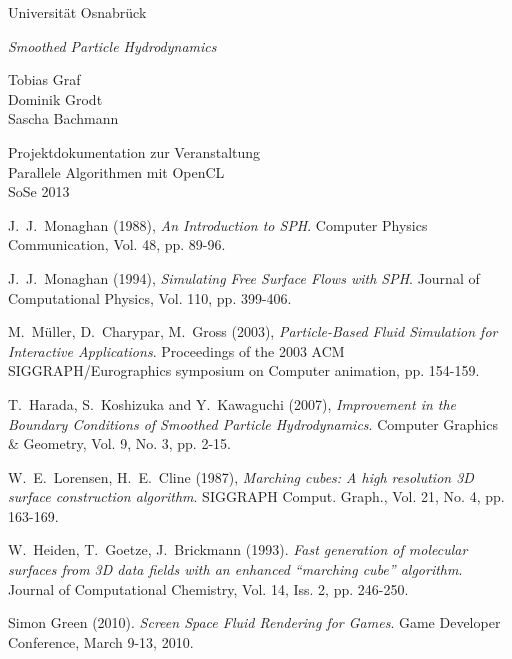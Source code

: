 \documentclass[a4paper,12pt,oneside]{amsbook}
\begin{document}
\begin{titlepage}
\begin{center}
{\large Universität Osnabrück}


\vspace{9em}
{\LARGE \emph{Smoothed Particle Hydrodynamics}}

\vspace{2em}
{\large Tobias Graf\\ Dominik Grodt\\ Sascha Bachmann}

\vspace{9em}
{\large Projektdokumentation zur Veranstaltung\\ Parallele Algorithmen mit OpenCL\\ SoSe 2013}



\end{center}
\end{titlepage}

\tableofcontents










\begin{thebibliography}{}


J.\ J.\ Monaghan (1988),
{\em An Introduction to SPH}. Computer Physics Communication, Vol. 48, pp. 89-96.


J.\ J.\ Monaghan (1994),
{\em Simulating Free Surface Flows with SPH}. Journal of Computational Physics, Vol. 110, pp. 399-406.


M.\ Müller, D.\ Charypar, M.\ Gross (2003),
{\em Particle-Based Fluid Simulation for Interactive Applications}. Proceedings of the 2003 ACM SIGGRAPH/Eurographics symposium on Computer animation, pp. 154-159.


T.\ Harada, S.\ Koshizuka and Y.\ Kawaguchi (2007),
{\em Improvement in the Boundary Conditions of Smoothed Particle Hydrodynamics}. Computer Graphics \& Geometry, Vol. 9, No. 3, pp. 2-15.


W.\ E.\ Lorensen, H.\ E.\ Cline (1987),
{\em Marching cubes: A high resolution 3D surface construction algorithm}. SIGGRAPH Comput. Graph., Vol. 21, No. 4, pp. 163-169.


W.\ Heiden, T.\ Goetze, J.\ Brickmann (1993). {\em Fast generation of molecular surfaces from 3D data fields with an enhanced ``marching cube'' algorithm}. Journal of Computational Chemistry, Vol. 14, Iss. 2, pp. 246-250.

Simon Green (2010). {\em Screen Space Fluid Rendering for Games}. Game Developer Conference, March 9-13, 2010.


\end{thebibliography}
\end{document}
